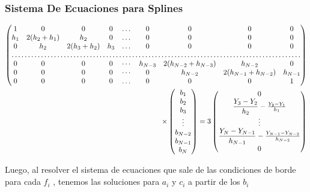 \begin{frame}[label=FrameSistemaEcuacionesSplines]
  \frametitle<presentation>{Sistema De Ecuaciones para Splines}

  \tiny
  \begin{equation}
   \begin{split}
      \begin{pmatrix}
	1 &     0      &    0    & 0 & \dots & 0 & 0 & 0 & 0 \\
	h_1& 2(h_2+h_1)& h_2     & 0 & \dots & 0 & 0 & 0 & 0 \\
	0  &  h_2  & 2(h_3+h_2) &h_3 & \dots & 0 & 0 & 0 & 0 \\
	\hdotsfor{9}\\
	0 & 0 & 0 & 0 & \cdots & h_{N-3} & 2(h_{N-2}+h_{N-3}) & h_{N-2} & 0 \\
	0 & 0 & 0 & 0 & \cdots & 0 & h_{N-2} &2(h_{N-1}+h_{N-2}) & h_{N-1} \\
	0 &     0      &    0    & 0 & \dots & 0 & 0 & 0 & 1
      \end{pmatrix} 
       \\
      \times 
      \begin{pmatrix}
	b_1 \\ b_2 \\ b_3 \\ \vdots \\ b_{N-2} \\ b_{N-1} \\ b_{N}
      \end{pmatrix} 
      = 
      3
      \begin{pmatrix}
	0 \\ 
	\dfrac{ Y_3 - Y_2 }{h_2} - \frac{ Y_2 - Y_1 }{h_1} \\
	\vdots \\
	\dfrac{ Y_N - Y_{N-1} }{h_{N-1}} - \frac{ Y_{N-1} - Y_{N-2} }{h_{N-2}} \\
	0
      \end{pmatrix}
    \end{split}
  \end{equation}
\end{frame}


Luego, al resolver el sistema de ecuaciones que sale de las condiciones
de borde para cada $f_i$ , tenemos las soluciones para $a_i$ y $c_i$ a partir de los 
$b_i$

\mode*

